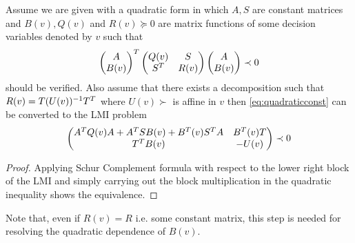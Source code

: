 \begin{lem} Assume we are given with a quadratic form in which $A,S$ are constant matrices and $B(v),Q(v)$ and $R(v)\succeq 0$ are matrix functions 
of some decision variables denoted by $v$ such that
\begin{equation}
\begin{pmatrix}A\\B(v)\end{pmatrix}^T\begin{pmatrix}Q(v) &S\\S^T &R(v)\end{pmatrix}\begin{pmatrix}A\\B(v)\end{pmatrix} \prec 0
\label{eq:quadraticconst}
\end{equation}
should be verified. Also assume that there exists a decomposition such that $R(v) = T(U(v))^{-1}T^T$ where $U(v)\succ$ is affine in $v$ then 
\eqref{eq:quadraticconst} can be converted to the LMI problem
\begin{equation}
\begin{pmatrix}A^TQ(v)A + A^TSB(v) + B^T(v)S^TA &B^T(v)T\\T^TB(v) &-U(v)\end{pmatrix}\prec 0
\label{eq:linearizedconst}
\end{equation}
\end{lem}

\begin{proof} Applying Schur Complement formula with respect to the lower right block of the LMI and simply carrying out the block
multiplication in the quadratic inequality shows the equivalence. 
\end{proof}
Note that, even if $R(v)=R$ i.e. some constant matrix, this step is needed for resolving the quadratic dependence of $B(v)$. 

